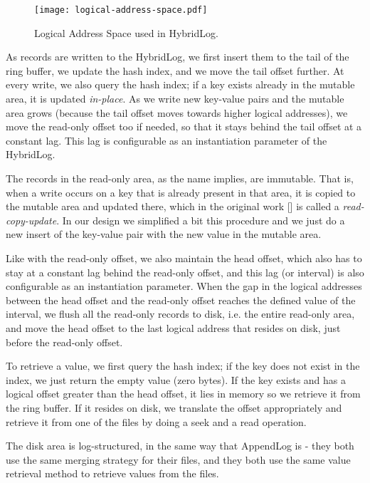 \vspace{20px}
\begin{figure}[h]
    \centering
    \texttt{[image: logical-address-space.pdf]}
    \caption{Logical Address Space used in HybridLog.}
    \label{fig:logical-address-space}
\end{figure}
\vspace{20px}

As records are written to the HybridLog, we first insert them to the tail of the ring buffer, we update the hash index, and we move the tail offset further.
At every write, we also query the hash index; if a key exists already in the mutable area, it is updated \textit{in-place}.
As we write new key-value pairs and the mutable area grows (because the tail offset moves towards higher logical addresses), we move the read-only offset too if needed, so that it stays behind the tail offset at a constant lag. This lag is configurable as an instantiation parameter of the HybridLog.

The records in the read-only area, as the name implies, are immutable. That is, when a write occurs on a key that is already present in that area, it is copied to the mutable area and updated there, which in the original work [\cite{faster}] is called a \textit{read-copy-update}. In our design we simplified a bit this procedure and we just do a new insert of the key-value pair with the new value in the mutable area.

Like with the read-only offset, we also maintain the head offset, which also has to stay at a constant lag behind the read-only offset, and this lag (or interval) is also configurable as an instantiation parameter.
When the gap in the logical addresses between the head offset and the read-only offset reaches the defined value of the interval, we flush all the read-only records to disk, i.e. the entire read-only area, and move the head offset to the last logical address that resides on disk, just before the read-only offset.

To retrieve a value, we first query the hash index; if the key does not exist in the index, we just return the empty value (zero bytes). If the key exists and has a logical offset greater than the head offset, it lies in memory so we retrieve it from the ring buffer. If it resides on disk, we translate the offset appropriately and retrieve it from one of the files by doing a seek and a read operation.

The disk area is log-structured, in the same way that AppendLog is - they both use the same merging strategy for their files, and they both use the same value retrieval method to retrieve values from the files.

